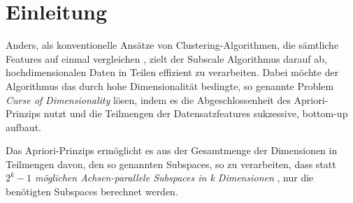 \section{Einleitung}

Anders, als konventionelle Ansätze von Clustering-Algorithmen, die sämtliche Features auf einmal
vergleichen \cite{7022654}, zielt der Subscale Algorithmus darauf ab, hochdimensionalen Daten in Teilen
effizient zu verarbeiten.
Dabei möchte der Algorithmus das durch hohe Dimensionalität bedingte, so genannte Problem \emph{Curse
of Dimensionality} lösen, indem es die Abgeschlossenheit des Apriori-Prinzips
\cite{TechnicalReviewonBuprenorphine:anAlternativeTreatmentforOpioidDependence.1992} nutzt und die
Teilmengen der
Datensatzfeatures sukzessive, bottom-up aufbaut.

Das Apriori-Prinzips ermöglicht es aus der Gesamtmenge der Dimensionen in Teilmengen davon, den
so genannten Subspaces, so zu verarbeiten, dass statt \emph{$2^{k}-1$ möglichen Achsen-parallele
Subspaces in \emph{k} Dimensionen} \cite{7022654}, nur die benötigten Subspaces berechnet werden.
